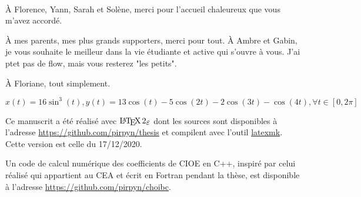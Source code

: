 ~{}\\

À Florence, Yann, Sarah et Solène, merci pour l'accueil chaleureux que vous m'avez accordé.

À mes parents, mes plus grands supporters, merci pour tout. À Ambre et Gabin, je vous souhaite le meilleur dans la vie étudiante et active qui s'ouvre à vous. J'ai ptet pas de flow, mais vous resterez "les petits".

À Floriane, tout simplement.

\href{https://www.wolframalpha.com/input/?i=parametric+plot+x+\%3D+16+sin\%5E3+t\%2C+y+\%3D+13+cos+t+-+5+cos\%282+t\%29+-+2+cos+\%28+3+t+\%29+-cos\%284t\%29}{\(x(t) = 16 \sin^3(t), y(t) = 13 \cos(t) - 5 \cos(2 t) - 2 \cos ( 3 t ) - \cos(4t), \forall t \in [0,2\pi]\)}


Ce manuscrit a été réalisé avec \(\LaTeXe\) dont les sources sont disponibles à l'adresse \url{https://github.com/pirpyn/thesis} et compilent avec l'outil \href{https://mg.readthedocs.io/latexmk.html}{latexmk}. 
Cette version est celle du 17/12/2020.

Un code de calcul numérique des coefficients de CIOE en C++, inspiré par celui réalisé qui appartient au CEA et écrit en Fortran pendant la thèse, est disponible à l'adresse \url{https://github.com/pirpyn/choibc}.


